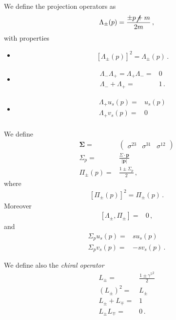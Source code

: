We define the projection operators as
\begin{align*}
  \Lambda_{\pm}(p)=\frac{\pm \cancel{p}+m}{2m}\,,
\end{align*}
with properties
\begin{itemize}
\item 
\begin{align*}
  \left[ \Lambda_{\pm}(p) \right]^2=\Lambda_{\pm}(p)\,.
\end{align*}
\item
  \begin{align*}
    \Lambda_-\Lambda_+=\Lambda_+\Lambda_-=&0 \nonumber\\
    \Lambda_-+\Lambda_+=&1\,.
  \end{align*}
\item
  \begin{align*}
    \Lambda_+ u_s(p)=&u_s(p)\nonumber\\
    \Lambda_+ v_s(p)=&0\nonumber\\
  \end{align*}
\end{itemize}

We define
\begin{align*}
  \boldsymbol{\Sigma}=&
  \begin{pmatrix}
   \sigma^{23}&\sigma^{31}&\sigma^{12} 
  \end{pmatrix}\nonumber\\
  \Sigma_p=&\frac{\Sigma\cdot\mathbf{p}}{|\mathbf{p}|}\nonumber\\
\Pi_{\pm}(p)=&\frac{1\pm\Sigma_{p}}{2}\,,
\end{align*}
where
\begin{align*}
  \left[ \Pi_{\pm}(p) \right]^2=\Pi_{\pm}(p)\,.
\end{align*}
Moreover
\begin{align*}
  \left[ \Lambda_{\pm},\Pi_{\pm} \right]=&0\,,
\end{align*}
and
\begin{align*}
  \Sigma_p u_s(p)=&s u_s(p) \nonumber\\
   \Sigma_p v_s(p)=&-s v_s(p)\,.
\end{align*}

We define also the \emph{chiral operator}
\begin{align*}
  L_{\pm}=&\frac{1\pm {\gamma^{5}}^{2}}{2}\nonumber\\
  \left(L_{\pm}\right)^2=&L_{\pm}\nonumber\\
  L_{\pm}+L_{\mp}=&1 \nonumber\\
  L_{\pm}L_{\mp}=&0\,.
\end{align*}


